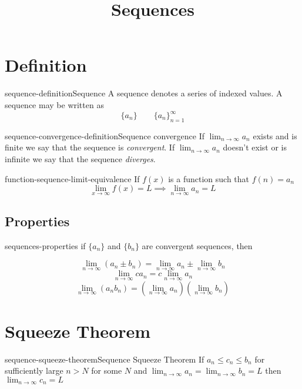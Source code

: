 \documentclass[preview]{standalone}
\begin{document}
\title{Sequences}
\genpage

\section{Definition}

\begin{snippetdefinition}{sequence-definition}{Sequence}
    A sequence denotes a series of indexed values.
    A sequence may be written as
    \[
        \{a_n\} \quad \quad {\{a_n\}}_{n=1}^\infty
    \]
\end{snippetdefinition}

\begin{snippetdefinition}{sequence-convergence-definition}{Sequence convergence}
    If \(\lim_{n \to \infty}a_n\) exists and is finite
    we say that the sequence is \textit{convergent}. If 
    \(\lim_{n \to \infty}a_n\) doesn't exist or is infinite
    we say that the sequence \textit{diverges}.
\end{snippetdefinition}

\begin{snippetcorollary}{function-sequence-limit-equivalence}{}
    If \(f(x)\) is a function such that \(f(n)=a_n\)
    \[
        \lim_{x\to\infty}f(x)=L \implies
        \lim_{n\to\infty}a_n=L
    \]
\end{snippetcorollary}

\subsection{Properties}

\begin{snippet}{sequences-properties}
    if \(\{a_n\}\) and \(\{b_n\}\) are convergent sequences, then

    \[
        \lim_{n\to\infty} (a_n \pm b_n) = \lim_{n\to\infty} a_n \pm
        \lim_{n\to\infty} b_n
    \]
    \[
        \lim_{n\to\infty} ca_n = c \lim_{n\to\infty} a_n
    \]
    \[
        \lim_{n\to\infty} (a_n b_n) =
        \left(\lim_{n\to\infty} a_n\right)
        \left(\lim_{n\to\infty} b_n\right)
    \]
\end{snippet}

\section{Squeeze Theorem}

\begin{snippettheorem}{sequence-squeeze-theorem}{Sequence Squeeze Theorem}
    If \(a_n \leq c_n \leq b_n\) for sufficiently large \(n>N\) for some \(N\)
    and \(\lim_{n\to\infty}a_n =\lim_{n\to\infty}b_n=L\)
    then \(\lim_{n\to\infty} c_n =L\)
\end{snippettheorem}
\end{document}
